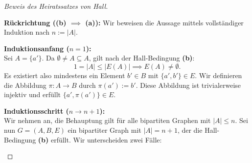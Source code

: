 \begin{proof}[Beweis des Heiratssatzes von Hall]
\begin{math-stroke}
\textbf{Rückrichtung (\texorpdfstring{\textbf{(b)} $\implies$ \textbf{(a)}}{b -> a}):}
Wir beweisen die Aussage mittels vollständiger Induktion nach $n := |A|$.
        
\textbf{Induktionsanfang ($n = 1$):} \\
Sei $A = \{a'\}$. Da $\emptyset \neq A \subseteq A$, gilt nach der Hall-Bedingung \textbf{(b)}:
\[
1 = |A| \le |E(A)| \implies E(A) \neq \emptyset.
\]
Es existiert also mindestens ein Element $b' \in B$ mit $\{a', b'\} \in E$. Wir definieren die Abbildung $\pi \colon A \to B$ durch $\pi(a') := b'$. Diese Abbildung ist trivialerweise injektiv und erfüllt $\{a', \pi(a')\} \in E$.
        
\textbf{Induktionsschritt ($n \to n+1$):} \\
Wir nehmen an, die Behauptung gilt für alle bipartiten Graphen mit $|A| \le n$. Sei nun $G = (A, B, E)$ ein bipartiter Graph mit $|A| = n+1$, der die Hall-Bedingung \textbf{(b)} erfüllt. Wir unterscheiden zwei Fälle:
        

\end{math-stroke}
\end{proof}
